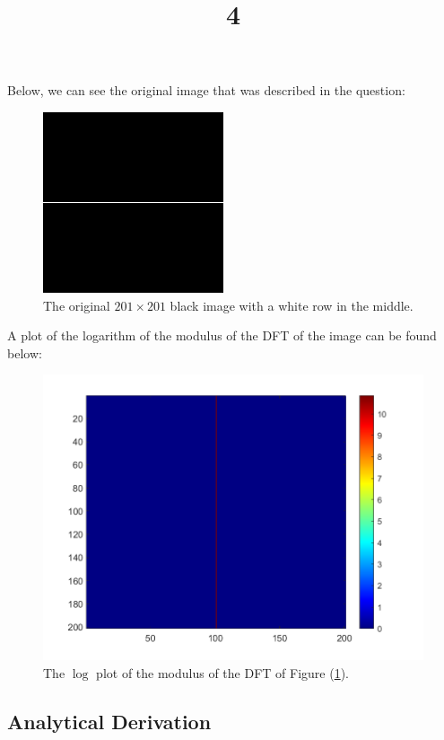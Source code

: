 \documentclass[a4paper]{article}
\title{4}
\date{}
\begin{document}
\maketitle

Below, we can see the original image that was described in the question:
\begin{figure}[h]
\centering
\includegraphics[scale=0.5]{raw_img.png}
\caption{The original $201\times 201$ black image with a white row in the middle.}
\label{f:orig}
\end{figure}

A plot of the logarithm of the modulus of the DFT of the image can be found below:
\begin{figure}[h]
\centering
\includegraphics[scale=0.5]{fft.png}
\caption{The $\log$ plot of the modulus of the DFT of Figure (\ref{f:orig}).}
\end{figure}

\subsection{Analytical Derivation}
\end{document}
